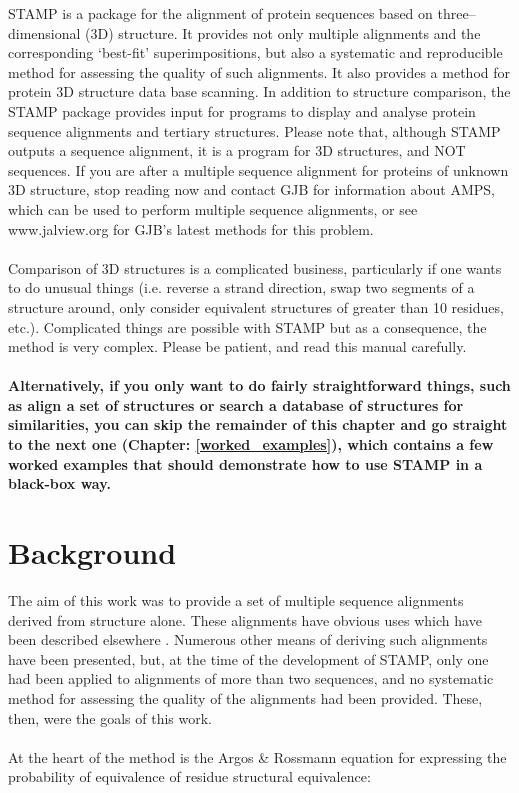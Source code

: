 STAMP is a package for the alignment of protein sequences based on
three--dimensional (3D) structure.  It provides not only multiple
alignments and the corresponding `best-fit' superimpositions, but
also a systematic and reproducible method for assessing the
quality of such alignments.  It also provides a method for protein
3D structure data base scanning.  In addition to structure
comparison, the STAMP package provides input for programs to
display and analyse protein sequence alignments and tertiary structures.
Please note that, although STAMP outputs a sequence alignment, it is 
a program for 3D structures, and NOT sequences.  If 
you are after a multiple sequence alignment for proteins of unknown 3D 
structure, stop reading now and contact GJB for information
about AMPS, which can be used to perform multiple sequence
alignments, or see www.jalview.org for GJB's latest methods for this problem.\\
\\
Comparison of 3D structures is a complicated
business, particularly if one wants to do unusual things (i.e.
reverse a strand direction, swap two segments of a structure
around, only consider equivalent structures of greater
than 10 residues, etc.). Complicated things are possible with STAMP but
as a consequence, the method is very complex.  Please be patient, and 
read this manual carefully.\\
\\
{\bf Alternatively, if you only want to do fairly straightforward things, such
as align a set of structures or search a database of structures for
similarities, you can skip the remainder of this chapter and go straight to the
next one (Chapter: \ref{worked_examples}), which contains a few worked examples that should demonstrate how
to use STAMP in a black-box way.}

\section{Background}

The aim of this work was to provide a set of multiple sequence
alignments derived from structure alone.  These alignments have 
obvious uses which have been described elsewhere \cite{rb92b,sali90}.  
Numerous other means of deriving such alignments have been 
presented, but, at the time of the development of STAMP, only one had
been applied to alignments of more than two sequences, and no 
systematic method for assessing the quality of the alignments had 
been provided.  These, then, were the goals of this work.\\
\\
At the heart of the method is the Argos \& Rossmann \cite{argos76}
equation for expressing the probability of equivalence of
residue structural equivalence:\\

